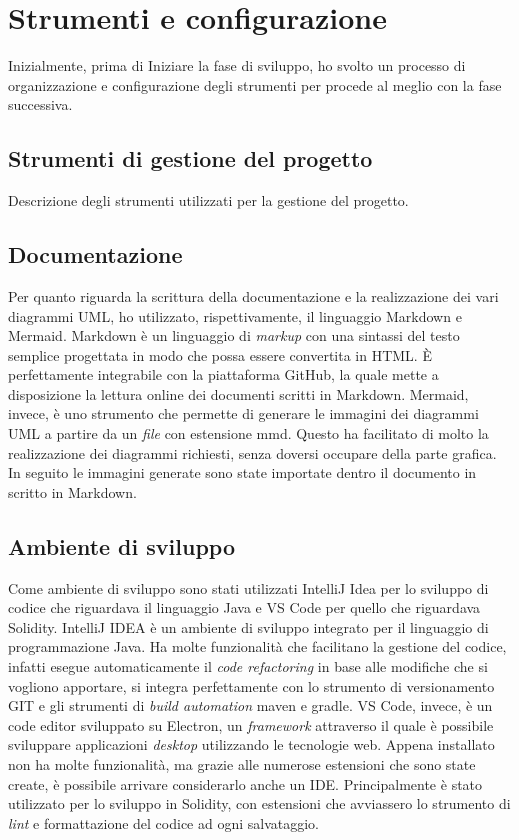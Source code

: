 
\section{Strumenti e configurazione}
Inizialmente, prima di Iniziare la fase di sviluppo, ho svolto un processo di organizzazione e configurazione degli strumenti per procede al meglio con la fase successiva. 

\subsection{Strumenti di gestione del progetto}
Descrizione degli strumenti utilizzati per la gestione del progetto.

\subsection{Documentazione}
Per quanto riguarda la scrittura della documentazione e la realizzazione dei vari diagrammi UML, ho utilizzato, rispettivamente, il linguaggio Markdown e Mermaid. Markdown è un linguaggio di \textit{markup} con una sintassi del testo semplice progettata in modo che possa essere convertita in HTML. È perfettamente integrabile con la piattaforma GitHub, la quale mette a disposizione la lettura online dei documenti scritti in Markdown.
Mermaid, invece, è uno strumento che permette di generare le immagini dei diagrammi UML a partire da un \textit{file} con estensione mmd. Questo ha facilitato di molto la realizzazione dei diagrammi richiesti, senza doversi occupare della parte grafica. In seguito le immagini generate sono state importate dentro il documento in scritto in Markdown.

\subsection{Ambiente di sviluppo}
Come ambiente di sviluppo sono stati utilizzati IntelliJ Idea per lo sviluppo di codice che riguardava il linguaggio Java e VS Code per quello che riguardava Solidity.
IntelliJ IDEA è un ambiente di sviluppo integrato per il linguaggio di programmazione Java. Ha molte funzionalità che facilitano la gestione del codice, infatti esegue automaticamente il \textit{code refactoring} in base alle modifiche che si vogliono apportare, si integra perfettamente con lo strumento di versionamento GIT e gli strumenti di \textit{build automation} maven e gradle.
VS Code, invece, è un code editor sviluppato su Electron, un \textit{framework} attraverso il quale è possibile sviluppare applicazioni \textit{desktop} utilizzando le tecnologie web. Appena installato non ha molte funzionalità, ma grazie alle numerose estensioni che sono state create, è possibile arrivare considerarlo anche un IDE. Principalmente è stato utilizzato per lo sviluppo in Solidity, con estensioni che avviassero lo strumento di \textit{lint} e formattazione del codice ad ogni salvataggio.

